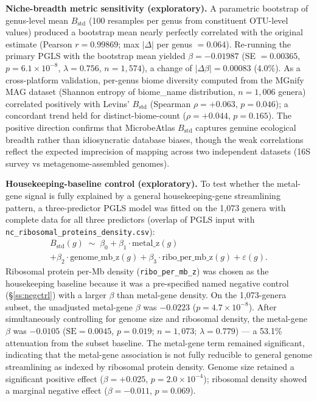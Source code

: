 \documentclass[times]{zHenriquesLab-StyleBioRxiv}
\begin{document}
\textbf{Niche-breadth metric sensitivity (exploratory).} A parametric
bootstrap of genus-level mean $B_\mathrm{std}$ (100 resamples per genus from
constituent OTU-level values) produced a bootstrap mean nearly perfectly
correlated with the original estimate (Pearson $r = 0.99869$; max $|\Delta|$
per genus $= 0.064$). Re-running the primary PGLS with the bootstrap mean
yielded $\beta = -0.01987$ (SE $= 0.00365$, $p = 6.1 \times 10^{-8}$,
$\lambda = 0.756$, $n = 1{,}574$), a change of $|\Delta\beta| = 0.00083$ (4.0\%). As a
cross-platform validation, per-genus biome diversity computed from the MGnify
MAG dataset (Shannon entropy of biome\_name distribution, $n = 1{,}006$ genera)
correlated positively with Levins' $B_\mathrm{std}$ (Spearman $\rho = +0.063$,
$p = 0.046$); a concordant trend held for distinct-biome-count ($\rho = +0.044$,
$p = 0.165$). The positive direction confirms that MicrobeAtlas $B_\mathrm{std}$
captures genuine ecological breadth rather than idiosyncratic database biases,
though the weak correlations reflect the expected imprecision of mapping across
two independent datasets (16S survey vs metagenome-assembled genomes).

\textbf{Housekeeping-baseline control (exploratory).} To test whether the
metal-gene signal is fully explained by a general housekeeping-gene streamlining
pattern, a three-predictor PGLS model was fitted on the 1,073 genera with
complete data for all three predictors (overlap of PGLS input with
\texttt{nc\_ribosomal\_proteins\_density.csv}):
%
\begin{multline}
B_\mathrm{std}(g) \;\sim\; \beta_0 + \beta_1 \cdot \mathrm{metal\_z}(g) \\
  + \beta_2 \cdot \mathrm{genome\_mb\_z}(g)
  + \beta_3 \cdot \mathrm{ribo\_per\_mb\_z}(g) + \varepsilon(g).
\end{multline}
%
Ribosomal protein per-Mb density (\texttt{ribo\_per\_mb\_z}) was chosen as the
housekeeping baseline because it was a pre-specified named negative control
(\S\ref{ss:negctrl}) with a larger $\beta$ than metal-gene density. On the
1,073-genera subset, the unadjusted metal-gene $\beta$ was $-0.0223$
($p = 4.7 \times 10^{-8}$). After simultaneously controlling for genome size
and ribosomal density, the metal-gene $\beta$ was $-0.0105$
($\mathrm{SE} = 0.0045$, $p = 0.019$; $n = 1{,}073$; $\hat{\lambda} = 0.779$)
--- a 53.1\% attenuation from the subset baseline. The metal-gene term remained
significant, indicating that the metal-gene association is not fully reducible to
general genome streamlining as indexed by ribosomal protein density. Genome size
retained a significant positive effect ($\beta = +0.025$,
$p = 2.0 \times 10^{-4}$); ribosomal density showed a marginal negative effect
($\beta = -0.011$, $p = 0.069$).
\end{document}
